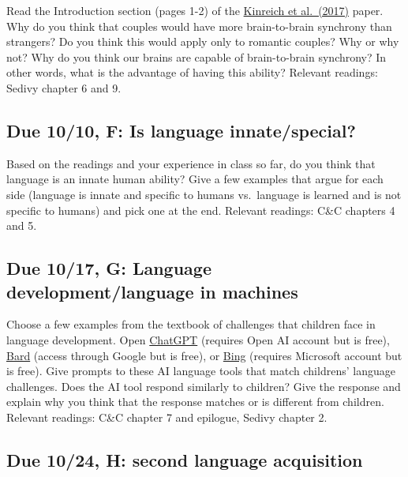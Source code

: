 \documentclass[
  letterpaper,
  DIV=11,
  numbers=noendperiod]{scrreprt}
\begin{document}
Read the Introduction section (pages 1-2) of the
\href{papers/Kinreichetal2017.pdf}{Kinreich et al.~(2017)} paper. Why do
you think that couples would have more brain-to-brain synchrony than
strangers? Do you think this would apply only to romantic couples? Why
or why not? Why do you think our brains are capable of brain-to-brain
synchrony? In other words, what is the advantage of having this ability?
Relevant readings: Sedivy chapter 6 and 9.

\hypertarget{due-1010-f-is-language-innatespecial}{%
\subsection*{Due 10/10, F: Is language
innate/special?}\label{due-1010-f-is-language-innatespecial}}

Based on the readings and your experience in class so far, do you think
that language is an innate human ability? Give a few examples that argue
for each side (language is innate and specific to humans vs.~language is
learned and is not specific to humans) and pick one at the end. Relevant
readings: C\&C chapters 4 and 5.

\hypertarget{due-1017-g-language-developmentlanguage-in-machines}{%
\subsection*{Due 10/17, G: Language development/language in
machines}\label{due-1017-g-language-developmentlanguage-in-machines}}

Choose a few examples from the textbook of challenges that children face
in language development. Open \href{https://chat.openai.com/}{ChatGPT}
(requires Open AI account but is free),
\href{https://bard.google.com/}{Bard} (access through Google but is
free), or \href{https://www.bing.com/?scope=web\&FORM=HDRSC2}{Bing}
(requires Microsoft account but is free). Give prompts to these AI
language tools that match childrens' language challenges. Does the AI
tool respond similarly to children? Give the response and explain why
you think that the response matches or is different from children.
Relevant readings: C\&C chapter 7 and epilogue, Sedivy chapter 2.

\hypertarget{due-1024-h-second-language-acquisition}{%
\subsection*{Due 10/24, H: second language
acquisition}\label{due-1024-h-second-language-acquisition}}
\end{document}
